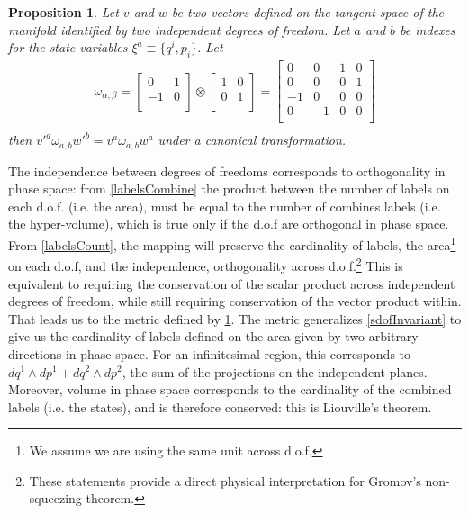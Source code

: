 \documentclass[aps,pra,10pt,twocolumn,floatfix,nofootinbib]{revtex4-1}
\newtheorem{prop}[thm]{Proposition}
\theoremstyle{definition}
\begin{document}
\begin{prop}\label{mdofInvariant}
Let $v$ and $w$ be two vectors defined on the tangent space of the manifold identified by two independent degrees of freedom. Let $a$ and $b$ be indexes for the state variables $\xi^a\equiv \{q^i, p_i\}$. Let
\begin{align*}
\omega_{\alpha, \beta} =  \left[
  \begin{array}{cc}
    0 & 1 \\
    -1 & 0 \\
  \end{array}
\right] \otimes \left[
  \begin{array}{cc}
    1 & 0 \\
    0 & 1 \\
  \end{array}
\right] =
\left[
  \begin{array}{cccc}
    0 & 0 & 1 & 0 \\
    0 & 0 & 0 & 1 \\
    -1 & 0 & 0 & 0 \\
    0 & -1 & 0 & 0 \\
  \end{array}
\right] \\
\end{align*}
then $v'^{a} \omega_{a, b} w'^{b}=v^{a} \omega_{a, b} w^{a}$ under a canonical transformation.
\end{prop}

The independence between degrees of freedoms corresponds to orthogonality in phase space: from \ref{labelsCombine} the product between the number of labels on each d.o.f. (i.e. the area), must be equal to the number of combines labels (i.e. the hyper-volume), which is true only if the d.o.f are orthogonal in phase space. From \ref{labelsCount}, the mapping will preserve the cardinality of labels, the area\footnote{We assume we are using the same unit across d.o.f.} on each d.o.f, and the independence, orthogonality across d.o.f.\footnote{These statements provide a direct physical interpretation for Gromov's non-squeezing theorem\cite{Gromov,deGosson,Stewart}.} This is equivalent to requiring the conservation of the scalar product across independent degrees of freedom, while still requiring conservation of the vector product within. That leads us to the metric defined by \ref{mdofInvariant}.
The metric generalizes \ref{sdofInvariant} to give us the cardinality of labels defined on the area given by two arbitrary directions in phase space. For an infinitesimal region, this corresponds to $dq^1 \wedge dp^1 + dq^2 \wedge dp^2$, the sum of the projections on the independent planes. Moreover, volume in phase space corresponds to the cardinality of the combined labels (i.e. the states), and is therefore conserved: this is Liouville's theorem.
\end{document}
